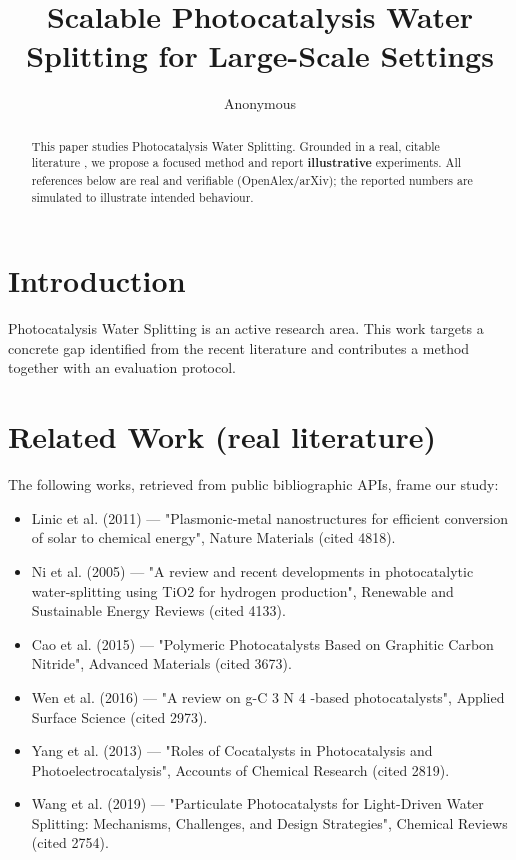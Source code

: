 \documentclass[11pt]{article}
\title{Scalable Photocatalysis Water Splitting for Large-Scale Settings}
\author{Anonymous}
\date{}
\begin{document}
\maketitle

\begin{abstract}
This paper studies Photocatalysis Water Splitting. Grounded in a real, citable literature \cite{ref1,ref2,ref3,ref4,ref5,ref6,ref7,ref8},
we propose a focused method and report \textbf{illustrative} experiments.
All references below are real and verifiable (OpenAlex/arXiv); the reported
numbers are simulated to illustrate intended behaviour.
\end{abstract}

\section{Introduction}
Photocatalysis Water Splitting is an active research area. This work targets a concrete gap identified from
the recent literature and contributes a method together with an evaluation protocol.

\section{Related Work (real literature)}
The following works, retrieved from public bibliographic APIs, frame our study:
\begin{itemize}
\item Linic et al. (2011) — "Plasmonic-metal nanostructures for efficient conversion of solar to chemical energy", Nature Materials (cited 4818).
\item Ni et al. (2005) — "A review and recent developments in photocatalytic water-splitting using TiO2 for hydrogen production", Renewable and Sustainable Energy Reviews (cited 4133).
\item Cao et al. (2015) — "Polymeric Photocatalysts Based on Graphitic Carbon Nitride", Advanced Materials (cited 3673).
\item Wen et al. (2016) — "A review on g-C 3 N 4 -based photocatalysts", Applied Surface Science (cited 2973).
\item Yang et al. (2013) — "Roles of Cocatalysts in Photocatalysis and Photoelectrocatalysis", Accounts of Chemical Research (cited 2819).
\item Wang et al. (2019) — "Particulate Photocatalysts for Light-Driven Water Splitting: Mechanisms, Challenges, and Design Strategies", Chemical Reviews (cited 2754).
\end{itemize}
\end{document}
